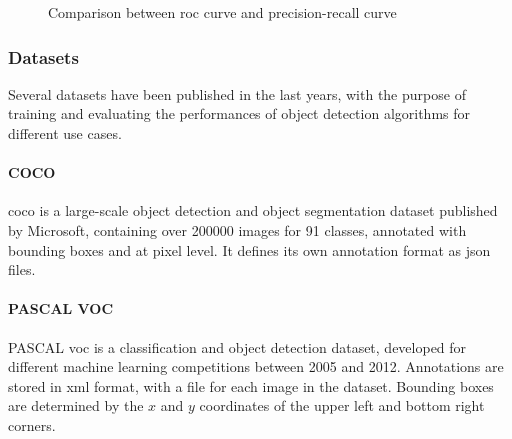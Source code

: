 \documentclass[%
    corpo=12pt,
    twoside,
    stile=classica,   
    tipotesi=magistrale,
    evenboxes,
    english,
	numerazioneromana,
]{toptesi}
\begin{document}
\begin{figure}[ht]
	\centering
	\caption{Comparison between \gls{roc} curve and precision-recall curve}
	\label{fig:roc_map}
\end{figure}

\subsubsection{Datasets}\label{sec:datasets}
Several datasets have been published in the last years, with the purpose of training and evaluating the performances of object detection algorithms for different use cases.

\paragraph{COCO}\label{sec:coco}
\gls{coco} is a large-scale object detection and object segmentation dataset published by Microsoft, containing over 200000 images for 91 classes, annotated with bounding boxes and at pixel level\cite{lin2015microsoft}. It defines its own annotation format as \acrshort{json} files.

\paragraph{PASCAL VOC}
PASCAL \gls{voc} is a classification and object detection dataset, developed for different machine learning competitions between 2005 and 2012\cite{voc}. Annotations are stored in \acrshort{xml} format, with a file for each image in the dataset. Bounding boxes are determined by the $x$ and $y$ coordinates of the upper left and bottom right corners.
\end{document}
